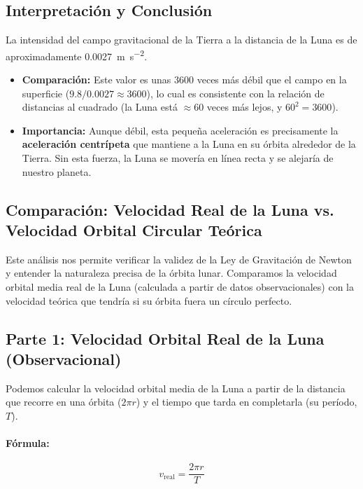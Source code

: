\documentclass[11pt,a4paper]{book}
\begin{document}
\subsection*{Interpretación y Conclusión}
La intensidad del campo gravitacional de la Tierra a la distancia de la Luna es de aproximadamente \SI{0.0027}{\meter\per\second\squared}.
\begin{itemize}
    \item \textbf{Comparación:} Este valor es unas \num{3600} veces más débil que el campo en la superficie ($\SI{9.8} / \SI{0.0027} \approx 3600$), lo cual es consistente con la relación de distancias al cuadrado (la Luna está $\approx 60$ veces más lejos, y $60^2 = 3600$).
    \item \textbf{Importancia:} Aunque débil, esta pequeña aceleración es precisamente la \textbf{aceleración centrípeta} que mantiene a la Luna en su órbita alrededor de la Tierra. Sin esta fuerza, la Luna se movería en línea recta y se alejaría de nuestro planeta.
\end{itemize}



\subsection{Comparación: Velocidad Real de la Luna vs. Velocidad Orbital Circular Teórica}

Este análisis nos permite verificar la validez de la Ley de Gravitación de Newton y entender la naturaleza precisa de la órbita lunar. Comparamos la velocidad orbital media real de la Luna (calculada a partir de datos observacionales) con la velocidad teórica que tendría si su órbita fuera un círculo perfecto.

\subsection*{Parte 1: Velocidad Orbital Real de la Luna (Observacional)}
Podemos calcular la velocidad orbital media de la Luna a partir de la distancia que recorre en una órbita ($2\pi r$) y el tiempo que tarda en completarla (su período, $T$).

\paragraph{Fórmula:}
\[ v_{\text{real}} = \frac{2\pi r}{T} \]
\end{document}

